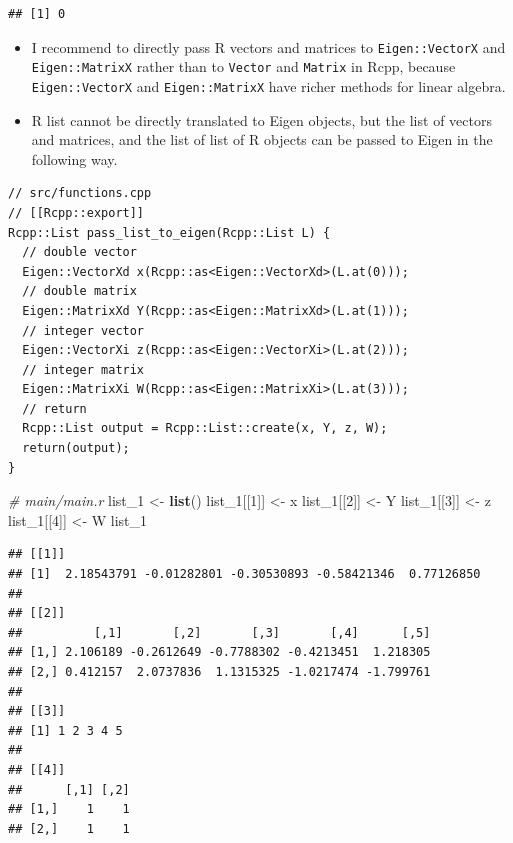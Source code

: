 \documentclass[]{book}
\newenvironment{Shaded}{\begin{snugshade}}{\end{snugshade}}
\newcommand{\KeywordTok}[1]{\textcolor[rgb]{0.13,0.29,0.53}{\textbf{#1}}}
\newcommand{\DecValTok}[1]{\textcolor[rgb]{0.00,0.00,0.81}{#1}}
\newcommand{\StringTok}[1]{\textcolor[rgb]{0.31,0.60,0.02}{#1}}
\newcommand{\CommentTok}[1]{\textcolor[rgb]{0.56,0.35,0.01}{\textit{#1}}}
\newcommand{\NormalTok}[1]{#1}
\begin{document}
\begin{verbatim}
## [1] 0
\end{verbatim}

\begin{itemize}
\item
  I recommend to directly pass R vectors and matrices to
  \texttt{Eigen::VectorX} and \texttt{Eigen::MatrixX} rather than to
  \texttt{Vector} and \texttt{Matrix} in Rcpp, because
  \texttt{Eigen::VectorX} and \texttt{Eigen::MatrixX} have richer
  methods for linear algebra.
\item
  R list cannot be directly translated to Eigen objects, but the list of
  vectors and matrices, and the list of list of R objects can be passed
  to Eigen in the following way.
\end{itemize}

\begin{verbatim}
// src/functions.cpp
// [[Rcpp::export]]
Rcpp::List pass_list_to_eigen(Rcpp::List L) {
  // double vector
  Eigen::VectorXd x(Rcpp::as<Eigen::VectorXd>(L.at(0)));
  // double matrix
  Eigen::MatrixXd Y(Rcpp::as<Eigen::MatrixXd>(L.at(1)));
  // integer vector
  Eigen::VectorXi z(Rcpp::as<Eigen::VectorXi>(L.at(2)));
  // integer matrix
  Eigen::MatrixXi W(Rcpp::as<Eigen::MatrixXi>(L.at(3)));
  // return
  Rcpp::List output = Rcpp::List::create(x, Y, z, W);
  return(output);
}
\end{verbatim}

\begin{Shaded}
\begin{Highlighting}[]
\CommentTok{# main/main.r}
\NormalTok{list_}\DecValTok{1}\NormalTok{ <-}\StringTok{ }\KeywordTok{list}\NormalTok{()}
\NormalTok{list_}\DecValTok{1}\NormalTok{[[}\DecValTok{1}\NormalTok{]] <-}\StringTok{ }\NormalTok{x}
\NormalTok{list_}\DecValTok{1}\NormalTok{[[}\DecValTok{2}\NormalTok{]] <-}\StringTok{ }\NormalTok{Y}
\NormalTok{list_}\DecValTok{1}\NormalTok{[[}\DecValTok{3}\NormalTok{]] <-}\StringTok{ }\NormalTok{z}
\NormalTok{list_}\DecValTok{1}\NormalTok{[[}\DecValTok{4}\NormalTok{]] <-}\StringTok{ }\NormalTok{W}
\NormalTok{list_}\DecValTok{1}
\end{Highlighting}
\end{Shaded}

\begin{verbatim}
## [[1]]
## [1]  2.18543791 -0.01282801 -0.30530893 -0.58421346  0.77126850
## 
## [[2]]
##          [,1]       [,2]       [,3]       [,4]      [,5]
## [1,] 2.106189 -0.2612649 -0.7788302 -0.4213451  1.218305
## [2,] 0.412157  2.0737836  1.1315325 -1.0217474 -1.799761
## 
## [[3]]
## [1] 1 2 3 4 5
## 
## [[4]]
##      [,1] [,2]
## [1,]    1    1
## [2,]    1    1
\end{verbatim}
\end{document}
